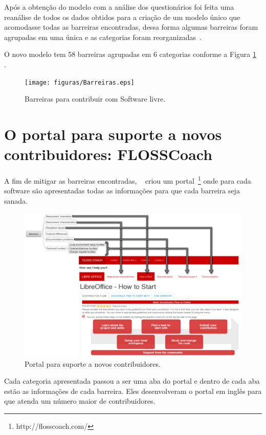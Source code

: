 Após a obtenção do modelo com a análise dos questionários foi feita uma reanálise
de todos os dados obtidos para a criação de um modelo único que acomodasse todas
as barreiras encontradas, dessa forma algumas barreiras foram agrupadas em uma única e 
as categorias foram reorganizadas~\cite{6943482}.

O novo modelo tem 58 barreiras agrupadas em 6 categorias conforme a Figura \ref{livre}
\\\cite{Steinmacher:2016:OOS:2884781.2884806}.

\begin{figure}[h]
	\centering
		\texttt{[image: figuras/Barreiras.eps]}
	\caption{Barreiras para contribuir com Software livre.}
	\label{livre}
\end{figure}

\section{O portal para suporte a novos contribuidores: FLOSSCoach}
\label{flosscoach}

A fim de mitigar as barreiras encontradas, ~ criou um portal~\footnote{http://flosscoach.com/} 
onde para cada software são apresentadas todas as informações para que cada barreira seja sanada.

\begin{figure}[h]
	\centering
	\label{portalFlossCoach}
		\includegraphics[keepaspectratio=true,scale=0.4]{figuras/portal.eps}
	\caption{Portal para suporte a novos contribuidores.}
\end{figure}

Cada categoria apresentada passou a ser uma aba do portal e dentro de cada aba 
estão as informações de cada barreira. Eles desenvolveram o portal em inglês
para que atenda um número maior de contribuidores.


